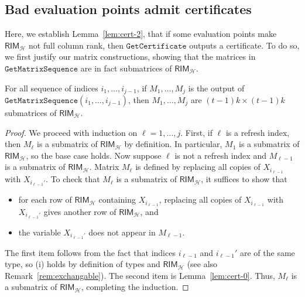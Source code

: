 \documentclass{article}[11pt]
\begin{document}
\subsection{Bad evaluation points admit certificates}

Here, we establish Lemma~\ref{lem:cert-2}, that if some evaluation points make $\mathsf{RIM}_\mathcal{H}$ not full column rank, then $\mathtt{GetCertificate}$ outputs a certificate.
To do so, we first justify our matrix constructions, showing that the matrices in $\mathtt{GetMatrixSequence}$ are in fact submatrices of $\mathsf{RIM}_\mathcal{H}$.

\begin{lemma}
  For all sequence of indices $i_1,\dots,i_{j-1}$, if $M_1,\dots,M_j$ is the output of $\mathtt{GetMatrixSequence}(i_1,\dots,i_{j-1})$, then $M_1,\dots,M_j$ are $(t-1)k\times (t-1)k$ submatrices of $\mathsf{RIM}_\mathcal{H}$.
  \label{lem:cert-1}
\end{lemma}
\begin{proof}
  We proceed with induction on $\ell=1,\dots,j$.
  First, if $\ell$ is a refresh index, then $M_\ell$ is a submatrix of $\mathsf{RIM}_\mathcal{H}$ by definition.
  In particular, $M_1$ is a submatrix of $\mathsf{RIM}_\mathcal{H}$, so the base case holds.
  Now suppose $\ell$ is not a refresh index and $M_{\ell-1}$ is a submatrix of $\mathsf{RIM}_\mathcal{H}$.
  Matrix $M_\ell$ is defined by replacing all copies of $X_{i_{\ell-1}}$ with $X_{i_{\ell-1}'}$.
  To check that $M_\ell$ is a submatrix of $\mathsf{RIM}_\mathcal{H}$, it suffices to show that
  \begin{itemize}
    \item[(i)] for each row of $\mathsf{RIM}_\mathcal{H}$ containing $X_{i_{\ell-1}}$, replacing all copies of $X_{i_{\ell-1}}$ with $X_{i_{\ell-1}'}$ gives another row of $\mathsf{RIM}_\mathcal{H}$, and
    \item[(ii)] the variable $X_{i_{\ell-1}'}$ does not appear in $M_{\ell-1}$.
  \end{itemize}
  The first item follows from the fact that indices $i_{\ell-1}$ and $i_{\ell-1}'$ are of the same type, so (i) holds by definition of types and $\mathsf{RIM}_\mathcal{H}$ (see also Remark~\ref{rem:exchangable}).
  The second item is Lemma~\ref{lem:cert-0}.
  Thus, $M_\ell$ is a submatrix of $\mathsf{RIM}_\mathcal{H}$, completing the induction.
\end{proof}
\end{document}
